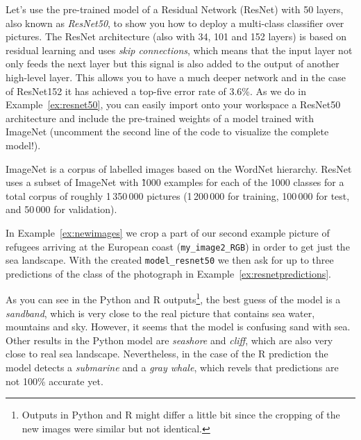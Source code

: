 Let's use the pre-trained model of a Residual Network (ResNet) with 50 layers, also known as \textit{ResNet50}, to show you how to deploy a multi-class classifier over pictures. The ResNet architecture (also with 34, 101 and 152 layers) is based on residual learning and uses \textit{skip connections}, which means that the input layer  not only feeds the next layer but this signal is also added to the output of another high-level layer. This allows you to have a much deeper network and in the case of ResNet152 it has achieved a top-five error rate of 3.6\%. As we do in Example~\ref{ex:resnet50}, you can easily import onto your workspace a ResNet50 architecture and include the pre-trained weights of a model trained with ImageNet (uncomment the second line of the code to visualize the complete model!).


ImageNet is a corpus of labelled images based on the WordNet hierarchy. ResNet uses a subset of ImageNet with \~1000 examples for each of the 1000 classes for a total corpus of roughly 1\,350\,000 pictures (1\,200\,000 for training, 100\,000 for test, and 50\,000 for validation).

In Example~\ref{ex:newimages} we crop a part of our second example picture of refugees arriving at the European coast (\texttt{my\_image2\_RGB}) in order to get just the sea landscape. With the created \texttt{model\_resnet50} we then ask for up to three predictions of the class of the photograph in Example~\ref{ex:resnetpredictions}.



As you can see in the Python and R outputs\footnote{Outputs in Python and R might differ a little bit since the cropping of the new images were similar but not identical.}, the best guess of the model is a \textit{sandband}, which is very close to the real picture that contains sea water, mountains and sky. However, it seems that the model is confusing sand with sea. Other results in the Python model are \textit{seashore} and \textit{cliff}, which are also very close to real sea landscape. Nevertheless, in the case of the R prediction the model detects a \textit{submarine} and a \textit{gray whale}, which revels that predictions are not 100\% accurate yet.

